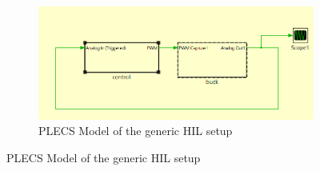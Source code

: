 \begin{figure}[htbp]
    \centering
    \begin{subfigure}[b]{0.9\textwidth}
        \centering
        \includegraphics[width=\textwidth]{img/HIL/generic_setup.png}
        \caption{PLECS Model of the generic HIL setup}
        \label{fig:plecs_model_generic_hil}
    \end{subfigure}


\end{figure}
